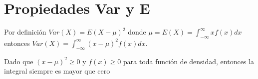 \section{Propiedades Var y E}
\begin{Demo}
    Por definición $Var(X) = E(X - \mu)^2$ donde $\mu = E(X) = \int_{-\infty}^{\infty}xf(x)dx$ 
    entonces $Var(X) = \int_{-\infty}^{\infty}(x-\mu)^2 f(x)dx$.

    Dado que $(x-\mu)^2 \geq 0$ y $f(x) \geq 0$ para toda función de densidad, entonces
    la integral siempre es mayor que cero
\end{Demo}
\clearpage
